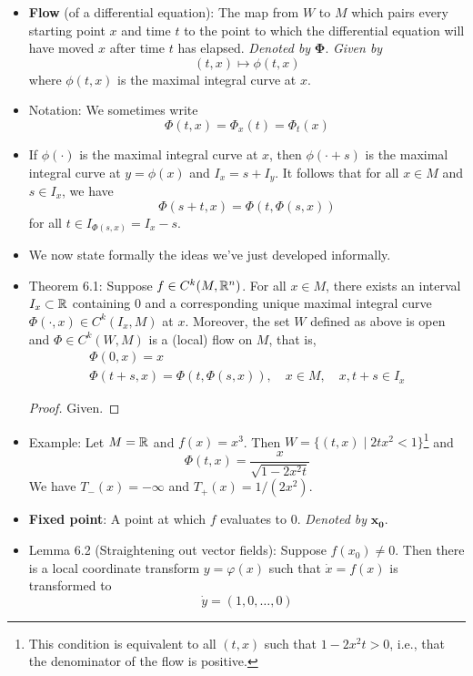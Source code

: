 \documentclass[../notes.tex]{subfiles}
\begin{document}
\begin{itemize}
    \item \textbf{Flow} (of a differential equation): The map from $W$ to $M$ which pairs every starting point $x$ and time $t$ to the point to which the differential equation will have moved $x$ after time $t$ has elapsed. \emph{Denoted by} $\bm{\Phi}$. \emph{Given by}
    \begin{equation*}
        (t,x) \mapsto \phi(t,x)
    \end{equation*}
    where $\phi(t,x)$ is the maximal integral curve at $x$.
    \item Notation: We sometimes write
    \begin{equation*}
        \Phi(t,x) = \Phi_x(t) = \Phi_t(x)
    \end{equation*}
    \item If $\phi(\cdot)$ is the maximal integral curve at $x$, then $\phi(\cdot +s)$ is the maximal integral curve at $y=\phi(x)$ and $I_x=s+I_y$. It follows that for all $x\in M$ and $s\in I_x$, we have
    \begin{equation*}
        \Phi(s+t,x) = \Phi(t,\Phi(s,x))
    \end{equation*}
    for all $t\in I_{\Phi(s,x)}=I_x-s$.
    \item We now state formally the ideas we've just developed informally.
    \item Theorem 6.1: Suppose $f\in C^k(M,\mathbb{R}^n)$. For all $x\in M$, there exists an interval $I_x\subset\mathbb{R}$ containing 0 and a corresponding unique maximal integral curve $\Phi(\cdot,x)\in C^k(I_x,M)$ at $x$. Moreover, the set $W$ defined as above is open and $\Phi\in C^k(W,M)$ is a (local) flow on $M$, that is,
    \begin{gather*}
        \Phi(0,x) = x\\
        \Phi(t+s,x) = \Phi(t,\Phi(s,x)),\quad
            x\in M,\quad
            x,t+s\in I_x
    \end{gather*}
    \begin{proof}
        Given.
    \end{proof}
    \item Example: Let $M=\mathbb{R}$ and $f(x)=x^3$. Then $W=\{(t,x)\mid 2tx^2<1\}$\footnote{This condition is equivalent to all $(t,x)$ such that $1-2x^2t>0$, i.e., that the denominator of the flow is positive.} and
    \begin{equation*}
        \Phi(t,x) = \frac{x}{\sqrt{1-2x^2t}}
    \end{equation*}
    We have $T_-(x)=-\infty$ and $T_+(x)=1/(2x^2)$.
    \item \textbf{Fixed point}: A point at which $f$ evaluates to 0. \emph{Denoted by} $\bm{x_0}$.
    \item Lemma 6.2 (Straightening out vector fields): Suppose $f(x_0)\neq 0$. Then there is a local coordinate transform $y=\varphi(x)$ such that $\dot{x}=f(x)$ is transformed to
    \begin{equation*}
        \dot{y} = (1,0,\dots,0)
    \end{equation*}
\end{itemize}
\end{document}
